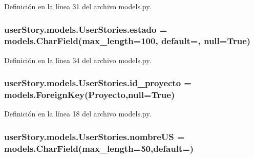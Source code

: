 Definición en la línea 31 del archivo models.\+py.

\subsubsection[{\texorpdfstring{estado}{estado}}]{\setlength{\rightskip}{0pt plus 5cm}user\+Story.\+models.\+User\+Stories.\+estado = models.\+Char\+Field(max\+\_\+length=100, default=\textquotesingle{}\textquotesingle{}, null=True)\hspace{0.3cm}{\ttfamily [static]}}\hypertarget{classuser_story_1_1models_1_1_user_stories_acdeffb640834747b701ee1b1562ea47d}{}\label{classuser_story_1_1models_1_1_user_stories_acdeffb640834747b701ee1b1562ea47d}


Definición en la línea 34 del archivo models.\+py.

\subsubsection[{\texorpdfstring{id\+\_\+proyecto}{id_proyecto}}]{\setlength{\rightskip}{0pt plus 5cm}user\+Story.\+models.\+User\+Stories.\+id\+\_\+proyecto = models.\+Foreign\+Key({\bf Proyecto},null=True)\hspace{0.3cm}{\ttfamily [static]}}\hypertarget{classuser_story_1_1models_1_1_user_stories_a129b6e2463b6ce9ec3ca204c408303e8}{}\label{classuser_story_1_1models_1_1_user_stories_a129b6e2463b6ce9ec3ca204c408303e8}


Definición en la línea 18 del archivo models.\+py.

\subsubsection[{\texorpdfstring{nombre\+US}{nombreUS}}]{\setlength{\rightskip}{0pt plus 5cm}user\+Story.\+models.\+User\+Stories.\+nombre\+US = models.\+Char\+Field(max\+\_\+length=50,default=\textquotesingle{}\textquotesingle{})\hspace{0.3cm}{\ttfamily [static]}}\hypertarget{classuser_story_1_1models_1_1_user_stories_a01fdc4470aae2e717becedffccd7da3d}{}\label{classuser_story_1_1models_1_1_user_stories_a01fdc4470aae2e717becedffccd7da3d}


